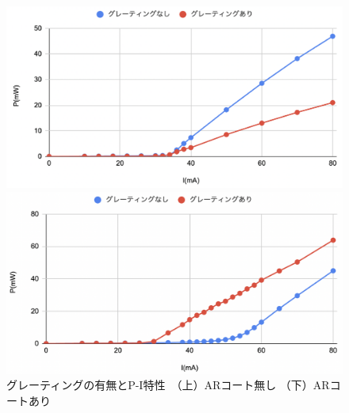 \documentclass[dvipdfmx]{jsreport}
\begin{document}
\begin{figure}[hbtp]
\centering
\begin{minipage}[b]{0.45\linewidth}
\includegraphics[width=1\textwidth]{images/ld_toptica.png}
\end{minipage}
\begin{minipage}[b]{0.45\linewidth}
\includegraphics[width=1\textwidth]{images/ld_nicha.png}
\end{minipage}
\caption{\label{fig:ar}グレーティングの有無とP-I特性　（上）ARコート無し （下）ARコートあり}
\end{figure}
\end{document}
